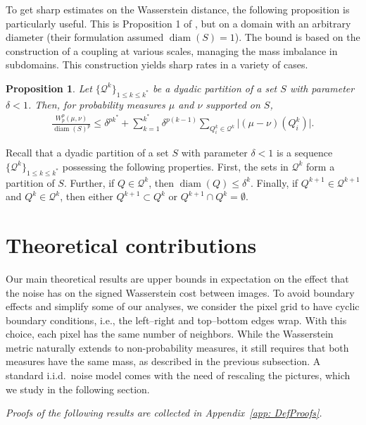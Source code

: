 \documentclass{article}
\theoremstyle{plain}
\newtheorem{prop}[thm]{Proposition}
\theoremstyle{definition}
\theoremstyle{remark}
\DeclareMathOperator{\diam}{diam}
\begin{document}
To get sharp estimates on the Wasserstein distance, the following proposition is particularly useful. 
This is Proposition 1 of \cite{WeedBach2019}, but on a domain with an arbitrary diameter (their formulation assumed $\diam(S)=1$). 
The bound is based on the construction of a coupling at various scales, managing the mass imbalance in subdomains. This construction yields sharp rates in a variety of cases.
\begin{prop}
\label{prop: Multiscale}
    Let $\{\mathcal{Q}^k\}_{1 \le k \le k^*}$ be a dyadic partition of a set $S$ with parameter $\delta <1$. Then, for probability measures $\mu$ and $\nu$ supported on $S$,
    \begin{align}
    \label{eq:dyadic_upper_bound}
        \frac{W_p^p  (\mu, \nu)}{\diam(S)^p}
        \le
        \delta^{pk^*}
        +
        \sum_{k=1}^{k^*}
        \delta^{p(k-1)}
        \sum_{Q_i^k \in \mathcal{Q}^k}
        \lvert
            (\mu-\nu)(Q_i^k)
        \rvert. \nonumber
    \end{align}
\end{prop}
Recall that a dyadic partition of a set $S$ with parameter $\delta <1$ is a sequence 
$\{\mathcal{Q}^k\}_{1 \le k \le k^*}$ possessing the following properties. First,  
the sets in $\mathcal{Q}^k$ form a partition of $S$. Further, 
if $Q\in \mathcal{Q}^k$, then $\diam(Q) \le \delta^k$. 
Finally, if $Q^{k+1}\in \mathcal{Q}^{k+1}$ and $Q^{k}\in \mathcal{Q}^{k}$, then either 
$
Q^{k+1} \subset Q^{k} 
$ or $Q^{k+1} \cap Q^{k} = \emptyset$.



\section{Theoretical contributions}

Our main theoretical results are upper bounds in expectation on the effect that the noise has on the signed Wasserstein cost between images.
To avoid boundary effects and simplify some of our analyses, we consider the pixel grid to have cyclic boundary conditions, i.e., the left–right and top–bottom edges wrap. With this choice, each pixel has the same number of neighbors.
While the Wasserstein metric naturally extends to non-probability measures, it still requires that both measures have the same mass, as described in the previous subsection. A standard i.i.d.\ noise model comes with the need of rescaling the pictures, which we study in the following section.

\emph{Proofs of the following results are collected in Appendix~\ref{app: DefProofs}.}
\end{document}
